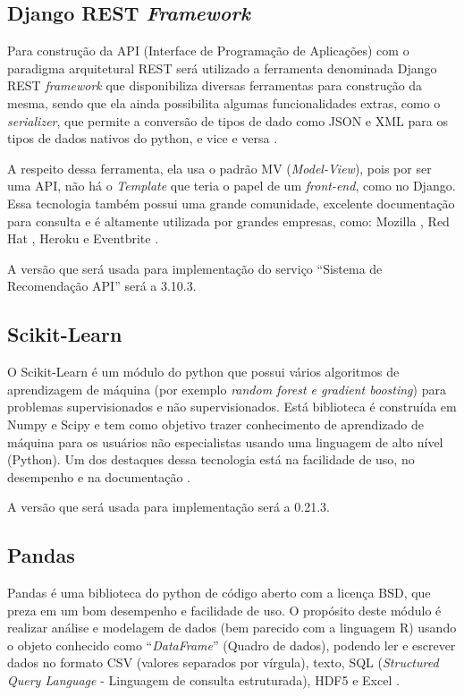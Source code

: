 \subsection{Django REST \textit{Framework}}

Para construção da API (Interface de Programação de Aplicações) com o paradigma arquitetural REST será utilizado a ferramenta denominada Django REST \textit{framework} que disponibiliza diversas ferramentas para construção da mesma, sendo que ela ainda possibilita algumas funcionalidades extras, como o \textit{serializer}, que permite a conversão de tipos de dado como JSON e XML para os tipos de dados nativos do python, e vice e versa \cite{DjangoRest:2019}.

A respeito dessa ferramenta, ela usa o padrão MV (\textit{Model-View}), pois por ser uma API, não há o \textit{Template} que teria o papel de um \textit{front-end}, como no Django. Essa tecnologia também possui uma grande comunidade, excelente documentação para consulta e é altamente utilizada por grandes empresas, como:  Mozilla , Red Hat , Heroku e Eventbrite \cite{DjangoRest:2019}.

A versão que será usada para implementação do serviço “Sistema de Recomendação API” será a 3.10.3.

\subsection{Scikit-Learn}

O Scikit-Learn é um módulo do python que possui vários algoritmos de aprendizagem de máquina (por exemplo \textit{random forest e gradient boosting}) para problemas supervisionados e não supervisionados. Está biblioteca é construída em Numpy e Scipy e tem como objetivo trazer conhecimento de aprendizado de máquina para os usuários não especialistas usando uma linguagem de alto nível (Python). Um dos destaques dessa tecnologia está na facilidade de uso, no desempenho e na documentação \cite{PREDEGOSA:2011}.

A versão que será usada para implementação será a 0.21.3.

\subsection{Pandas}

Pandas é uma biblioteca do python de código aberto com a licença BSD, que preza em um bom desempenho e facilidade de uso. O propósito deste módulo é realizar análise e modelagem de dados (bem parecido com a linguagem R) usando o objeto conhecido como “\textit{DataFrame}” (Quadro de dados), podendo ler e escrever dados no formato CSV (valores separados por vírgula), texto, SQL (\textit{Structured Query Language} - Linguagem de consulta estruturada), HDF5 e Excel \cite{pandas:2019}.

